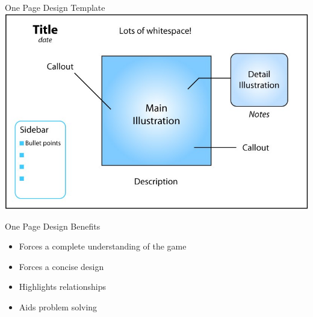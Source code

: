 \begin{frame}{One Page Design Template}
\includegraphics[width=1.0\textwidth]{one_page_design_template}
\end{frame}

\begin{frame}{One Page Design Benefits}
\begin{itemize}
	\item Forces a complete understanding of the game
	\item Forces a concise design
	\item Highlights relationships
	\item Aids problem solving
\end{itemize}
\end{frame}
